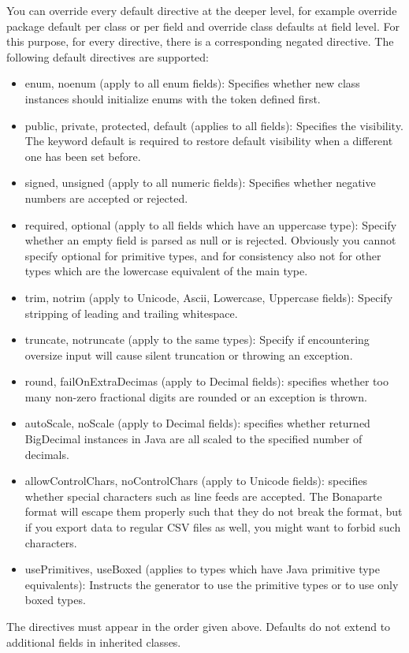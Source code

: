 \documentclass[11pt,a4paper,oneside]{article}
\begin{document}
\noindent You can override every default directive at the deeper level, for example override package default per class or per field and override class defaults
at field level. For this purpose, for every directive, there is a corresponding negated directive.
The following default directives are supported:
\begin{itemize}
   \item {\ttfamily enum}, {\ttfamily noenum} (apply to all enum fields): Specifies whether new class instances should
   initialize enums with the token defined first.
  \item {\ttfamily public}, {\ttfamily private}, {\ttfamily protected}, {\ttfamily default} (applies to all fields): Specifies the visibility. The keyword
   {\ttfamily default} is required to restore default visibility when a different one has been set before.
   \item {\ttfamily signed}, {\ttfamily unsigned} (apply to all numeric fields): Specifies whether negative numbers are accepted or rejected.
   \item {\ttfamily required}, {\ttfamily optional} (apply to all fields which have an uppercase type): Specify whether an empty field is parsed as
    {\ttfamily null} or is rejected. Obviously you cannot specify {\ttfamily optional} for primitive types, and for consistency also not for other types which
    are the lowercase equivalent of the main type.
  \item {\ttfamily trim}, {\ttfamily notrim} (apply to {\ttfamily Unicode}, {\ttfamily Ascii}, {\ttfamily Lowercase}, {\ttfamily Uppercase} fields):
    Specify stripping of leading and trailing whitespace.
  \item {\ttfamily truncate}, {\ttfamily notruncate} (apply to the same types): Specify if encountering oversize input will cause silent truncation or throwing an exception.
  \item {\ttfamily round}, {\ttfamily failOnExtraDecimas} (apply to {\ttfamily Decimal} fields): specifies whether too many
  non-zero fractional digits are rounded or an exception is thrown.
  \item {\ttfamily autoScale}, {\ttfamily noScale} (apply to {\ttfamily Decimal} fields): specifies
  whether returned {\ttfamily BigDecimal} instances in Java are all scaled to the specified number of decimals.
  \item {\ttfamily allowControlChars}, {\ttfamily noControlChars} (apply to {\ttfamily Unicode} fields): specifies whether special characters such as line feeds are accepted.
    The Bonaparte format will escape them properly such that they do not break the format, but if you export data to regular CSV files as well, you might want to
    forbid such characters.
  \item {\ttfamily usePrimitives}, {\ttfamily useBoxed} (applies to types which have Java primitive type equivalents): Instructs the generator to use the primitive types
    or to use only boxed types.
\end{itemize}
The directives must appear in the order given above. Defaults do not extend to additional fields in inherited classes.
\end{document}
